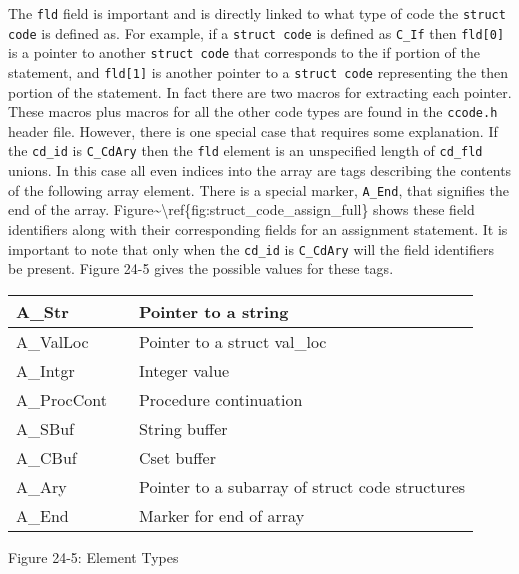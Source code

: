 The \texttt{fld} field is important and is directly linked to what
type of code the \texttt{struct code} is defined as.  For example, if
a \texttt{struct code} is defined as \texttt{C\_If} then
\texttt{fld[0]} is a pointer to another \texttt{struct code} that
corresponds to the if portion of the statement, and \texttt{fld[1]} is
another pointer to a \texttt{struct code} representing the then
portion of the statement. In fact there are two macros for extracting
each pointer. These macros plus macros for all the other code types
are found in the \texttt{ccode.h} header file. However, there is one
special case that requires some explanation. If the \texttt{cd\_id} is
\texttt{C\_CdAry} then the \texttt{fld} element is an unspecified
length of \texttt{cd\_fld} unions. In this case all even indices into
the array are tags describing the contents of the following array
element. There is a special marker, \texttt{A\_End}, that signifies
the end of the array.
Figure\~{}{\textbackslash}ref\{fig:struct\_code\_assign\_full\} shows
these field identifiers along with their corresponding fields for an
assignment statement. It is important to note that only when the
\texttt{cd\_id} is \texttt{C\_CdAry} will the field identifiers be
present. Figure 24-5 gives the possible values for these tags.

\begin{center}
\tabletail{}
\tablelasttail{}
\begin{supertabular}{|m{0.93935984in}|m{0.41775984in}|m{3.12266in}|}
\hline
 A\_Str &
 &
 Pointer to a string\\\hline
 A\_ValLoc &
 &
 Pointer to a struct val\_loc\\\hline
 A\_Intgr &
 &
 Integer value\\\hline
 A\_ProcCont &
 &
 Procedure continuation\\\hline
 A\_SBuf &
 &
 String buffer\\\hline
 A\_CBuf &
 &
 Cset buffer\\\hline
 A\_Ary &
 &
 Pointer to a subarray of struct code structures\\\hline
 A\_End &
 &
 Marker for end of array\\\hline
\end{supertabular}
\end{center}
{\centering{}
Figure 24-5: Element Types
\par}

